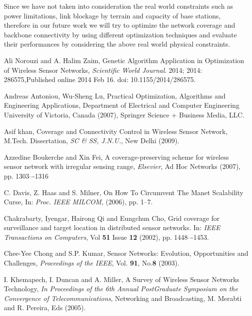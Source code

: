 \documentclass[11pt]{article}
\numberwithin{equation}{section}
\begin{document}
    Since we have not taken into consideration the real world constraints such as power limitations, link blockage by terrain and capacity of base stations, therefore in our future work we will try to optimize the network coverage and backbone connectivity by using different optimization techniques and evaluate their performances by considering the above real world physical constraints.
\begin{thebibliography}{99}

 Ali Norouzi and A. Halim Zaim, Genetic Algorithm Application in Optimization of Wireless Sensor Networks, \emph{Scientific World Journal}. 2014; 2014: 286575,Published online 2014 Feb 16. doi:  10.1155/2014/286575.

 Andreas Antoniou, Wu-Sheng Lu, Practical Optimization, Algorithms and Engineering Applications, Department of Electrical and Computer Engineering University of Victoria, Canada (2007), Springer Science + Business Media, LLC.




 Asif khan, Coverage and Connectivity Control in Wireless Sensor Network, M.Tech. Dissertation, \textit{SC \& SS, J.N.U.}, New Delhi (2009).

 Azzedine Boukerche and Xin Fei, A coverage-preserving scheme for wireless sensor network with irregular sensing range, \textit{Elsevier}, Ad Hoc Networks (2007), pp. 1303–-1316




 C. Davis, Z. Haas and S. Milner, On How To Circumvent The Manet Scalability Curse, In:\textit{ Proc. IEEE MILCOM,} (2006), pp. 1--7.



 Chakrabarty, Iyengar, Hairong Qi and Eungchun Cho, Grid coverage for surveillance and target location in distributed sensor networks. In: \textit{IEEE Transactions on Computers}, Vol \textbf{51} Issue \textbf{12} (2002), pp. 1448–-1453.

 Chee-Yee Chong and S.P. Kumar, Sensor Networks: Evolution, Opportunities and Challenges, \textit{Proceedings of the IEEE}, Vol. \textbf{91}, No.\textbf{8} (2003).



 I. Khemapech, I. Duncan and A. Miller, A Survey of Wireless Sensor Networks Technology, \textit{In Proceedings of the 6th Annual PostGraduate Symposium on the Convergence of Telecommunications}, Networking and Broadcasting, M. Merabti and R. Pereira, Eds (2005).


\end{thebibliography}
\end{document}
